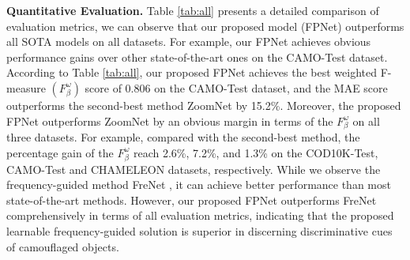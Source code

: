 \documentclass[sigconf,screen]{acmart}
\begin{document}
\noindent \textbf{Quantitative Evaluation. }
Table \ref{tab:all} presents a detailed comparison of evaluation metrics, we can observe that our proposed model (FPNet) outperforms all SOTA models on all datasets. 
For example, our FPNet achieves obvious performance gains over other state-of-the-art ones on the CAMO-Test dataset. According to Table \ref{tab:all}, our proposed FPNet achieves the best weighted F-measure \((F_\beta ^\omega)\) score of 0.806 on the CAMO-Test dataset, and the MAE score outperforms the second-best method ZoomNet \cite{r55} by 15.2\%. 
Moreover, the proposed FPNet outperforms ZoomNet \cite{r55} by an obvious margin in terms of the \(F_\beta ^\omega\) on all three datasets. 
For example, compared with the second-best method, the percentage gain of the $F_{\beta}^{\omega}$ reach 2.6\%, 7.2\%, and 1.3\% on the COD10K-Test, CAMO-Test and CHAMELEON datasets, respectively.
While we observe the frequency-guided method FreNet \cite{r39}, it can achieve better performance than most state-of-the-art methods.
However, our proposed FPNet outperforms FreNet comprehensively in terms of all evaluation metrics, indicating that the proposed learnable frequency-guided solution is superior in discerning discriminative cues of camouflaged objects.
\end{document}
